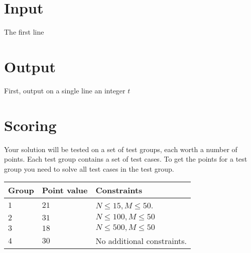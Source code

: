 \noindent



\section*{Input}
\noindent
The first line 

\section*{Output}
\noindent
First, output on a single line an integer $t$

\section*{Scoring}
Your solution will be tested on a set of test groups, each worth a number of points. 
Each test group contains a set of test cases. 
To get the points for a test group you need to solve all test cases in the test group.

\noindent
\begin{tabular}{| l | l | p{12cm} |}
  \hline
  \textbf{Group} & \textbf{Point value} & \textbf{Constraints} \\ \hline
  $1$    & $21$         & $N \leq 15, M \leq 50$.  \\ \hline
  $2$    & $31$         & $N \leq 100, M \leq 50$ \\ \hline
  $3$    & $18$         & $N \leq 500, M \leq 50$ \\ \hline
  $4$    & $30$         & No additional constraints. \\ \hline
\end{tabular}

